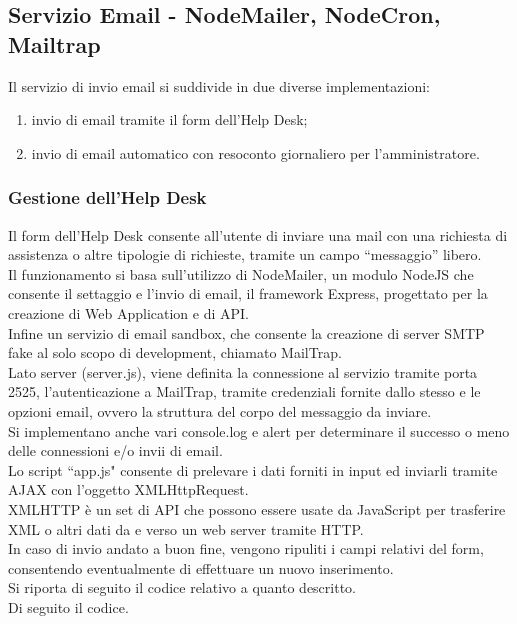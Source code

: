 \begin{flushleft}
\begin{lstlisting}
\end{lstlisting}
\newpage

\subsection{Servizio Email - NodeMailer, NodeCron, Mailtrap}

Il servizio di invio email si suddivide in due diverse implementazioni:
\begin{enumerate}
\item invio di email tramite il form dell’Help Desk;
\item invio di email automatico con resoconto giornaliero per l’amministratore.
\end{enumerate}


\subsubsection{Gestione dell'Help Desk}
Il form dell’Help Desk consente all’utente di inviare una mail con una richiesta di assistenza o altre tipologie di richieste, tramite un campo “messaggio” libero.\\
Il funzionamento si basa sull’utilizzo di NodeMailer, un modulo NodeJS che consente il settaggio e l’invio di email, il framework Express, progettato per la creazione di Web Application e di API.\\
Infine un servizio di email sandbox, che consente la creazione di server SMTP fake al solo scopo di development, chiamato MailTrap.\\
Lato server (server.js), viene definita la connessione al servizio tramite porta 2525, l’autenticazione a MailTrap, tramite credenziali fornite dallo stesso e le opzioni email, ovvero la struttura del corpo del messaggio da inviare.\\
Si implementano anche vari console.log e alert per determinare il successo o meno delle connessioni e/o invii di email.\\
Lo script “app.js" consente di prelevare i dati forniti in input ed inviarli tramite AJAX con l’oggetto XMLHttpRequest.\\
XMLHTTP è un set di API che possono essere usate da JavaScript per trasferire XML o altri dati da e verso un web server tramite HTTP.\\
In caso di invio andato a buon fine, vengono ripuliti i campi relativi del form, consentendo eventualmente di effettuare un nuovo inserimento.\\
Si riporta di seguito il codice relativo a quanto descritto.\\
Di seguito il codice.\\
\vspace{0.6 em}

\begin{lstlisting}
\end{lstlisting}

\end{flushleft}
